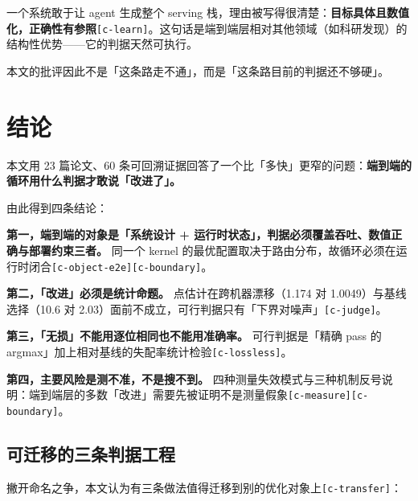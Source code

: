 一个系统敢于让 agent 生成整个 serving 栈，理由被写得很清楚：\textbf{目标具体且数值化，正确性有参照}{\scriptsize\texttt{[c-\hspace{0pt}learn]}}。这句话是端到端层相对其他领域（如科研发现）的结构性优势——它的判据天然可执行。


本文的批评因此不是「这条路走不通」，而是「这条路目前的判据还不够硬」。


\section{结论}

本文用 23 篇论文、60 条可回溯证据回答了一个比「多快」更窄的问题：\textbf{端到端的循环用什么判据才敢说「改进了」。}


由此得到四条结论：


\textbf{第一，端到端的对象是「系统设计 + 运行时状态」，判据必须覆盖吞吐、数值正确与部署约束三者。} 同一个 kernel 的最优配置取决于路由分布，故循环必须在运行时闭合{\scriptsize\texttt{[c-\hspace{0pt}object-\hspace{0pt}e2e]}}{\scriptsize\texttt{[c-\hspace{0pt}boundary]}}。


\textbf{第二，「改进」必须是统计命题。} 点估计在跨机器漂移（1.174 对 1.0049）与基线选择（10.6 对 2.03）面前不成立，可行判据只有「下界对噪声」{\scriptsize\texttt{[c-\hspace{0pt}judge]}}。


\textbf{第三，「无损」不能用逐位相同也不能用准确率。} 可行判据是「精确 pass 的 argmax」加上相对基线的失配率统计检验{\scriptsize\texttt{[c-\hspace{0pt}lossless]}}。


\textbf{第四，主要风险是测不准，不是搜不到。} 四种测量失效模式与三种机制反号说明：端到端层的多数「改进」需要先被证明不是测量假象{\scriptsize\texttt{[c-\hspace{0pt}measure]}}{\scriptsize\texttt{[c-\hspace{0pt}boundary]}}。


\subsection{可迁移的三条判据工程}

撇开命名之争，本文认为有三条做法值得迁移到别的优化对象上{\scriptsize\texttt{[c-\hspace{0pt}transfer]}}：


